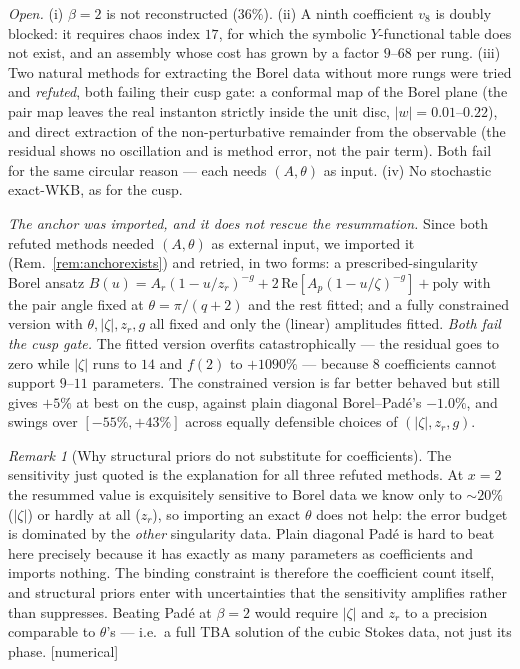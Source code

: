 \documentclass[11pt,reqno]{amsart}
\theoremstyle{plain}
\theoremstyle{definition}
\theoremstyle{remark}
\newtheorem{remark}[theorem]{Remark}
\newcommand{\tagN}{{\footnotesize\textsf{[numerical]}}}
\begin{document}
\emph{Open.} (i) $\beta=2$ is not reconstructed ($36\%$). (ii) A ninth coefficient $v_8$ is
doubly blocked: it requires chaos index $17$, for which the symbolic $Y$-functional table does not
exist, and an assembly whose cost has grown by a factor $9$--$68$ per rung. (iii) Two natural
methods for extracting the Borel data without more rungs were tried and \emph{refuted}, both
failing their cusp gate: a conformal map of the Borel plane (the pair map leaves the real instanton
strictly inside the unit disc, $|w|=0.01$--$0.22$), and direct extraction of the non-perturbative
remainder from the observable (the residual shows no oscillation and is method error, not the pair
term). Both fail for the same circular reason --- each needs $(A,\theta)$ as input. (iv) No
stochastic exact-WKB, as for the cusp.

\emph{The anchor was imported, and it does not rescue the resummation.} Since both refuted methods
needed $(A,\theta)$ as external input, we imported it (Rem.~\ref{rem:anchorexists}) and retried, in
two forms: a prescribed-singularity Borel ansatz
$B(u)=A_r(1-u/z_r)^{-g}+2\,\mathrm{Re}[A_p(1-u/\zeta)^{-g}]+\text{poly}$ with the pair angle fixed at
$\theta=\pi/(q+2)$ and the rest fitted; and a fully constrained version with $\theta,|\zeta|,z_r,g$
all fixed and only the (linear) amplitudes fitted. \emph{Both fail the cusp gate.} The fitted version
overfits catastrophically --- the residual goes to zero while $|\zeta|$ runs to $14$ and $f(2)$ to
$+1090\%$ --- because $8$ coefficients cannot support $9$--$11$ parameters. The constrained version
is far better behaved but still gives $+5\%$ at best on the cusp, against plain diagonal
Borel--Pad\'e's $-1.0\%$, and swings over $[-55\%,+43\%]$ across equally defensible choices of
$(|\zeta|,z_r,g)$.

\begin{remark}[Why structural priors do not substitute for coefficients]\label{rem:whypriorsfail}
The sensitivity just quoted is the explanation for all three refuted methods. At $x=2$ the resummed
value is exquisitely sensitive to Borel data we know only to $\sim20\%$ ($|\zeta|$) or hardly at all
($z_r$), so importing an exact $\theta$ does not help: the error budget is dominated by the
\emph{other} singularity data. Plain diagonal Pad\'e is hard to beat here precisely because it has
exactly as many parameters as coefficients and imports nothing. The binding constraint is therefore
the coefficient count itself, and structural priors enter with uncertainties that the sensitivity
amplifies rather than suppresses. Beating Pad\'e at $\beta=2$ would require $|\zeta|$ and $z_r$ to a
precision comparable to $\theta$'s --- i.e.\ a full TBA solution of the cubic Stokes data, not just
its phase. \tagN
\end{remark}
\end{document}
